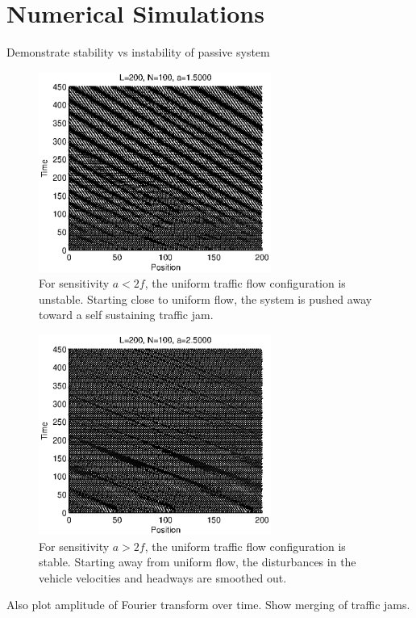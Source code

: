 \documentclass[10pt,twocolumn]{article}
\newcommand{\lm}{\fontfamily{\sfdefault}\selectfont}
\begin{document}
\section{Numerical Simulations}

Demonstrate stability vs instability of passive system
\begin{figure}[!h]
\lm
\begin{center}
\includegraphics[width=3in]{instability}
\end{center}
\caption{ \label{fig:instability} For sensitivity $a<2f$, the uniform traffic flow configuration is unstable. Starting close to uniform flow, the system is pushed away toward a self sustaining traffic jam.}
\end{figure}


\begin{figure}[!h]
\lm
\begin{center}
\includegraphics[width=3in]{smoothed}
\end{center}
\caption{ \label{fig:smoothed} For sensitivity $a>2f$, the uniform traffic flow configuration is stable. Starting away from uniform flow, the disturbances in the vehicle velocities and headways are smoothed out.}
\end{figure}

Also plot amplitude of Fourier transform over time. Show merging of traffic jams.
\end{document}
